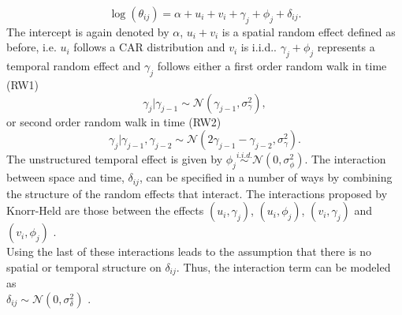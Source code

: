 \begin{equation}
    \log\left(\theta_{ij}\right)=\alpha+u_i+v_i+\gamma_j+\phi_j+\delta_{ij}.
\end{equation}
The intercept is again denoted by $\alpha$, $u_i + v_i$ is a spatial random effect defined as before, i.e. $u_i$ follows a CAR distribution and $v_i$ is i.i.d.. $\gamma_j+\phi_j$ represents a temporal random effect and $\gamma_j$ follows either a first order random walk in time (RW1)
\begin{equation}
    \gamma_j|\gamma_{j-1}\sim\mathcal{N}\left(\gamma_{j-1},\sigma_\gamma^2\right),
\end{equation}
or second order random walk in time (RW2)
\begin{equation}
    \gamma_j|\gamma_{j-1},\gamma_{j-2}\sim\mathcal{N}\left(2\gamma_{j-1}-\gamma_{j-2},\sigma_\gamma^2\right).
\end{equation}
The unstructured temporal effect is given by $\phi_j\overset{i.i.d.}{\sim}\mathcal{N}\left(0, \sigma_\phi^2\right)$. The interaction between space and time, $\delta_{ij}$, can be specified in a number of ways by combining the structure of the random effects that interact. The interactions proposed by Knorr-Held are those between the effects $\left(u_i,\gamma_j\right)$, $\left(u_i,\phi_j\right)$, $\left(v_i,\gamma_j\right)$ and $\left(v_i,\phi_j\right)$ \autocite[][]{knorr2000bayesian}. \\
Using the last of these interactions leads to the assumption that there is no spatial or temporal structure on $\delta_{ij}$. Thus, the interaction term can be modeled as \\ $\delta_{ij}\sim\mathcal{N}\left(0,\sigma_\delta^2\right)$ \autocite[][]{moraga2019geospatial}.
